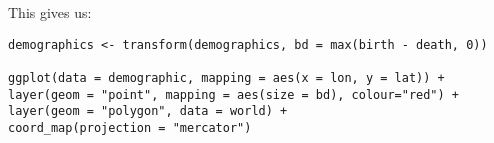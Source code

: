 This gives us:

\begin{verbatim}
demographics <- transform(demographics, bd = max(birth - death, 0))

ggplot(data = demographic, mapping = aes(x = lon, y = lat)) + 
layer(geom = "point", mapping = aes(size = bd), colour="red") +
layer(geom = "polygon", data = world) +
coord_map(projection = "mercator")
\end{verbatim}





